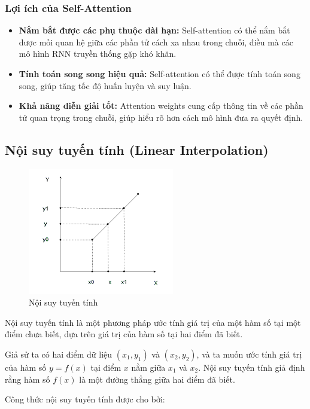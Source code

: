 \subsubsection{Lợi ích của Self-Attention}

\begin{itemize}
    \item \textbf{Nắm bắt được các phụ thuộc dài hạn:} Self-attention có thể nắm bắt được mối quan hệ giữa các phần tử cách xa nhau trong chuỗi, điều mà các mô hình RNN truyền thống gặp khó khăn.
    \item \textbf{Tính toán song song hiệu quả:} Self-attention có thể được tính toán song song, giúp tăng tốc độ huấn luyện và suy luận.
    \item \textbf{Khả năng diễn giải tốt:} Attention weights cung cấp thông tin về các phần tử quan trọng trong chuỗi, giúp hiểu rõ hơn cách mô hình đưa ra quyết định.
\end{itemize}

\subsection{Nội suy tuyến tính (Linear Interpolation)}

\begin{figure}[H]
    \centering
    \includegraphics[scale = 1]{Images/Theoretical basis/linear_interpolation.png}
    \caption{Nội suy tuyến tính}    
\end{figure}

Nội suy tuyến tính là một phương pháp ước tính giá trị của một hàm số tại một điểm chưa biết, dựa trên giá trị của hàm số tại hai điểm đã biết. 

Giả sử ta có hai điểm dữ liệu $(x_1, y_1)$ và $(x_2, y_2)$, và ta muốn ước tính giá trị của hàm số $y = f(x)$ tại điểm $x$ nằm giữa $x_1$ và $x_2$. Nội suy tuyến tính giả định rằng hàm số $f(x)$ là một đường thẳng giữa hai điểm đã biết. 

Công thức nội suy tuyến tính được cho bởi:

